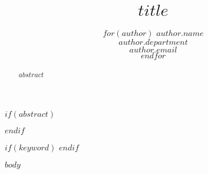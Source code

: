 \documentclass{article}
\title{$title$}
\author{
  $for(author)$
    $author.name$ \\
    $author.department$ \\
    \texttt{$author.email$} \\
    \And
  $endfor$
}
\begin{document}
\maketitle

$if(abstract)$
\begin{abstract}
  $abstract$
\end{abstract}
$endif$

$if(keyword)$
$endif$

$body$
\end{document}

